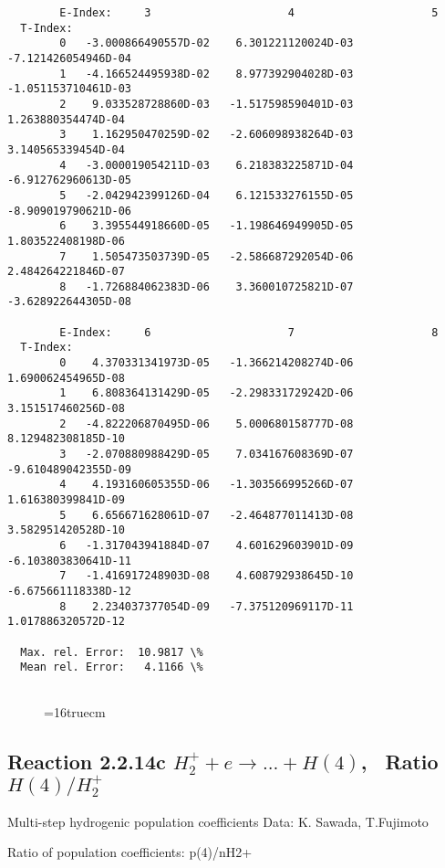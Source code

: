 \documentclass[12pt,dvipdfmx]{article}
\begin{document}
{\begin{small}
\begin{verbatim}
        E-Index:     3                     4                     5
  T-Index:
        0   -3.000866490557D-02    6.301221120024D-03   -7.121426054946D-04
        1   -4.166524495938D-02    8.977392904028D-03   -1.051153710461D-03
        2    9.033528728860D-03   -1.517598590401D-03    1.263880354474D-04
        3    1.162950470259D-02   -2.606098938264D-03    3.140565339454D-04
        4   -3.000019054211D-03    6.218383225871D-04   -6.912762960613D-05
        5   -2.042942399126D-04    6.121533276155D-05   -8.909019790621D-06
        6    3.395544918660D-05   -1.198646949905D-05    1.803522408198D-06
        7    1.505473503739D-05   -2.586687292054D-06    2.484264221846D-07
        8   -1.726884062383D-06    3.360010725821D-07   -3.628922644305D-08

        E-Index:     6                     7                     8
  T-Index:
        0    4.370331341973D-05   -1.366214208274D-06    1.690062454965D-08
        1    6.808364131429D-05   -2.298331729242D-06    3.151517460256D-08
        2   -4.822206870495D-06    5.000680158777D-08    8.129482308185D-10
        3   -2.070880988429D-05    7.034167608369D-07   -9.610489042355D-09
        4    4.193160605355D-06   -1.303566995266D-07    1.616380399841D-09
        5    6.656671628061D-07   -2.464877011413D-08    3.582951420528D-10
        6   -1.317043941884D-07    4.601629603901D-09   -6.103803830641D-11
        7   -1.416917248903D-08    4.608792938645D-10   -6.675661118338D-12
        8    2.234037377054D-09   -7.375120969117D-11    1.017886320572D-12

  Max. rel. Error:  10.9817 \%
  Mean rel. Error:   4.1166 \%


\end{verbatim}\end{small}
\begin{figure} \label{2.2.14b}
\epsfxsize=16truecm
\end{figure}
\newpage

\subsection{
Reaction 2.2.14c $ H_2^+ + e \rightarrow ...+ H(4) $, \   Ratio $H(4)/H_2^+  $
}

 Multi-step hydrogenic population coefficients
 Data: K. Sawada, T.Fujimoto \cite{kn:Sawada}

 Ratio of population coefficients: p(4)/nH2+


}
\end{document}
